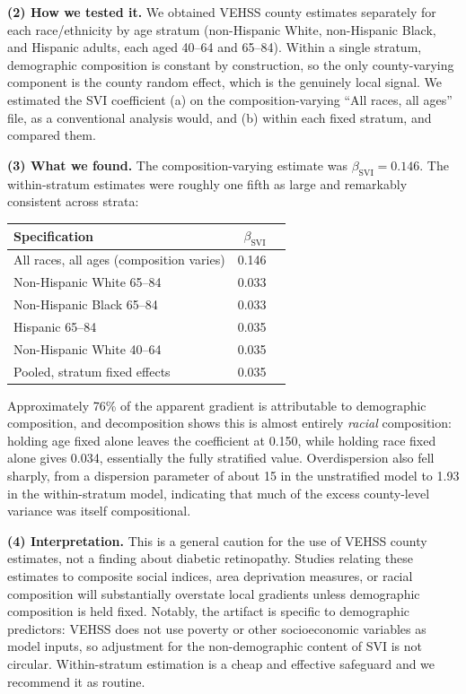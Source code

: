 \documentclass[11pt]{article}
\newcommand{\tpart}[1]{\medskip\noindent\textbf{#1}\quad}
\begin{document}
\tpart{(2) How we tested it.}
We obtained VEHSS county estimates separately for each race/ethnicity by age
stratum (non-Hispanic White, non-Hispanic Black, and Hispanic adults, each aged
40--64 and 65--84). Within a single stratum, demographic composition is constant
by construction, so the only county-varying component is the county random
effect, which is the genuinely local signal. We estimated the SVI coefficient
(a) on the composition-varying ``All races, all ages'' file, as a conventional
analysis would, and (b) within each fixed stratum, and compared them.

\tpart{(3) What we found.}
The composition-varying estimate was $\beta_{\mathrm{SVI}} = 0.146$. The
within-stratum estimates were roughly one fifth as large and remarkably
consistent across strata:

\begin{center}
\begin{tabular}{lrr}
\toprule
Specification & $\beta_{\mathrm{SVI}}$ & \\
\midrule
All races, all ages (composition varies)   & 0.146 & \\
Non-Hispanic White 65--84                  & 0.033 & \\
Non-Hispanic Black 65--84                  & 0.033 & \\
Hispanic 65--84                            & 0.035 & \\
Non-Hispanic White 40--64                  & 0.035 & \\
\midrule
Pooled, stratum fixed effects              & 0.035 & \\
\bottomrule
\end{tabular}
\end{center}

Approximately 76\% of the apparent gradient is attributable to demographic
composition, and decomposition shows this is almost entirely \emph{racial}
composition: holding age fixed alone leaves the coefficient at 0.150, while
holding race fixed alone gives 0.034, essentially the fully stratified value. Overdispersion also fell sharply, from a dispersion parameter of
about 15 in the unstratified model to 1.93 in the within-stratum model,
indicating that much of the excess county-level variance was itself
compositional.

\tpart{(4) Interpretation.}
This is a general caution for the use of VEHSS county estimates, not a finding
about diabetic retinopathy. Studies relating these estimates to composite social
indices, area deprivation measures, or racial composition will substantially
overstate local gradients unless demographic composition is held fixed. Notably,
the artifact is specific to demographic predictors: VEHSS does not use poverty
or other socioeconomic variables as model inputs, so adjustment for the
non-demographic content of SVI is not circular. Within-stratum estimation is a
cheap and effective safeguard and we recommend it as routine.
\end{document}
